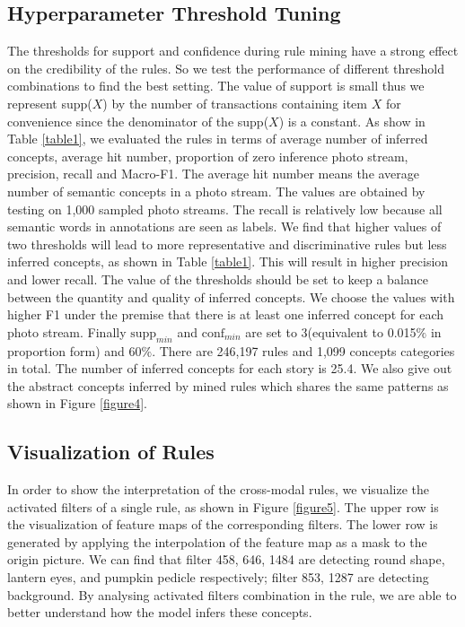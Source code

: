 \documentclass[sigconf]{acmart}
\begin{document}
\subsection{Hyperparameter Threshold Tuning}
The thresholds for support and confidence during rule mining have a strong effect on the credibility of the rules. So we test the performance of different threshold combinations to find the best setting. The value of support is small thus we represent supp($X$) by the number of transactions containing item $X$ for convenience since the denominator of the supp($X$) is a constant.
As show in Table \ref{table1}, we evaluated the rules in terms of average number of inferred concepts, average hit number, proportion of zero inference photo stream, precision, recall and Macro-F1. The average hit number means the average number of semantic concepts in a photo stream. The values are obtained by testing on 1,000 sampled photo streams. The recall is relatively low because all semantic words in annotations are seen as labels. We find that higher values of two thresholds will lead to more representative and discriminative rules but less inferred concepts, as shown in Table \ref{table1}. This will result in higher precision and lower recall. The value of the thresholds should be set to keep a balance between the quantity and quality of inferred concepts. We choose the values with higher F1 under the premise that there is at least one inferred concept for each photo stream.  Finally $\text{supp}_{min}$ and $\text{conf}_{min}$ are set to 3(equivalent to 0.015$\%$ in proportion form) and 60$\%$. There are 246,197 rules and 1,099 concepts categories in total. The number of inferred concepts for each story is 25.4. We also give out the abstract concepts inferred by mined rules which shares the same patterns as shown in Figure \ref{figure4}.

\subsection{Visualization of Rules}
In order to show the interpretation of the cross-modal rules, we visualize the activated filters of a single rule, as shown in Figure \ref{figure5}. The upper row is the visualization of feature maps of the corresponding filters. The lower row is generated by applying the interpolation of the feature map as a mask to the origin picture. We can find that filter 458, 646, 1484 are detecting round shape, lantern eyes, and pumpkin pedicle respectively; filter 853, 1287 are detecting background. By analysing activated filters combination in the rule, we are able to better understand how the model infers these concepts.
\end{document}
